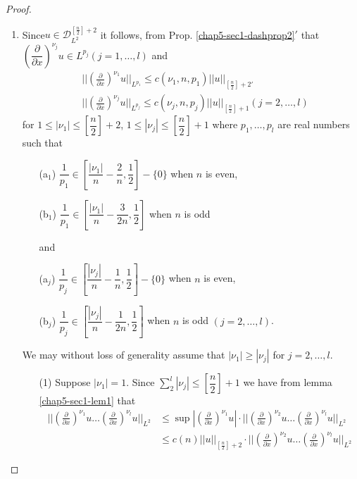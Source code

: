 \begin{proof}
\begin{enumerate}[\rm(i)]
\item  Since\pageoriginale $u \in
\mathscr{D}^{\left[\frac{n}{2}\right]+2}_{L^2}$ it follows, from
Prop. \ref{chap5-sec1-dashprop2}$'$ that  
$\left(\dfrac{\partial}{\partial x}\right)^{\nu_j} u \in L^{p_j} (j=1,
\ldots, l)$ and  
\begin{align*}
& || \left(\frac{\partial}{\partial x}\right)^{\nu_1} u ||_{L^{p_1}}
\leq c (\nu_1, n, p_1) || u ||_{\left[\frac{n}{2}\right]+2'} \\ 
& || \left(\frac{\partial}{\partial x}\right)^{\nu_j} u ||_{L^{p_j}}
\leq c (\nu_j, 
 n, p_j) || u ||_{\left[\frac{n}{2} \right]+1} (j=2, \ldots, l) 
\end{align*}
for $1 \leq | \nu_1 | \leq \left[\dfrac{n}{2}\right]+2$, $1 \leq | \nu_j
| \leq \left[\dfrac{n}{2} \right]+1$ where $p_1, \ldots, p_l$ are real
numbers such that   
\begin{itemize}
\item[(a$_1$)] $\dfrac{1}{p_1} \in \left[ \dfrac{|
    \nu_1|}{n}- \dfrac{2}{n}, \dfrac{1}{2}\right]-\{0\}$ when $n$ is
  even, 

\item[(b$_1$)] $ \dfrac{1}{p_1} \in \left[ \dfrac{|
    \nu_1|}{n}- \dfrac{3}{2n}, \dfrac{1}{2}\right]$ when $n$ is odd 

and 
\item[(a$_j$)] $\dfrac{1}{p_j} \in \left[ \dfrac{| \nu_j|}{n}-
  \dfrac{1}{n}, \dfrac{1}{2}\right] -\{0\}$ when $n$ is even,

\item[(b$_j$)]  $\dfrac{1}{p_j} \in \left[ \dfrac{| \nu_j|}{n}-
  \dfrac{1}{2n}, \dfrac{1}{2}\right]$ when $n$ is odd $(j = 2, \ldots,
l)$. 
\end{itemize}

We may without loss of generality assume that $| \nu_1 | \geq |
\nu_j | $ for $j=2, \ldots, l$. 
\begin{itemize}
\item[(1)] Suppose $| \nu_1| = 1$. Since $\sum^l_2 | \nu_j | \leq
  \left[\dfrac{n}{2} \right]+1$ we have from lemma \ref{chap5-sec1-lem1} that 
\begin{align*}
||\left(\frac{\partial}{\partial x}\right)^{\nu_1} u \ldots
\left(\frac{\partial}{\partial x}\right)^{\nu_l} u ||_{L^2}  & \leq \sup |
\left(\frac{\partial}{\partial x}\right)^{\nu_1} u| \cdot ||
\left(\frac{\partial}{\partial x}\right)^{\nu_2} u \ldots
\left(\frac{\partial}{\partial x}\right)^{\nu_l} u ||_{L^2} \\ 
& \leq c(n) || u ||_{\left[\frac{n}{2} \right]+2} \cdot ||
\left(\frac{\partial}{\partial  x}\right)^{\nu_2} u \ldots
\left(\frac{\partial}{\partial x}\right)^{\nu_l} u  ||_{L^2} 
\end{align*}
\end{itemize}


\end{enumerate}
\end{proof}
